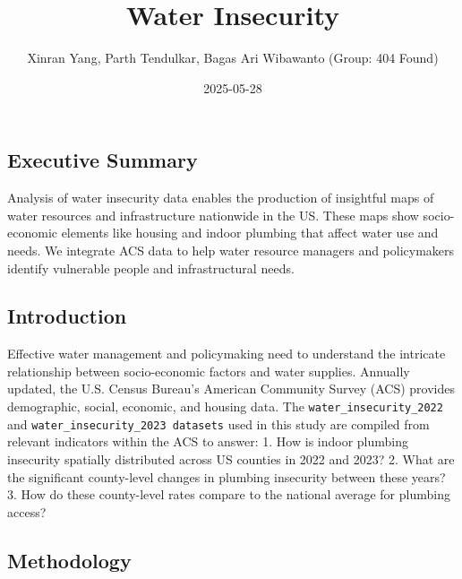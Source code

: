 \documentclass[
  letterpaper,
  DIV=11,
  numbers=noendperiod]{scrartcl}
\title{Water Insecurity}
\author{Xinran Yang, Parth Tendulkar, Bagas Ari Wibawanto (Group: 404
Found)}
\date{2025-05-28}
\renewcommand*\contentsname{Table of contents}
\newcommand\contentsname{Table of contents}
\begin{document}
\maketitle
\ifdefined\Shaded\renewenvironment{Shaded}{\begin{tcolorbox}[boxrule=0pt, breakable, borderline west={3pt}{0pt}{shadecolor}, interior hidden, sharp corners, enhanced, frame hidden]}{\end{tcolorbox}}\fi

\renewcommand*\contentsname{Table of contents}
{
\hypersetup{linkcolor=}
\setcounter{tocdepth}{2}
\tableofcontents
}
\hypertarget{executive-summary}{%
\subsection{Executive Summary}\label{executive-summary}}

Analysis of water insecurity data enables the production of insightful
maps of water resources and infrastructure nationwide in the US. These
maps show socio-economic elements like housing and indoor plumbing that
affect water use and needs. We integrate ACS data to help water resource
managers and policymakers identify vulnerable people and infrastructural
needs.

\hypertarget{introduction}{%
\subsection{Introduction}\label{introduction}}

Effective water management and policymaking need to understand the
intricate relationship between socio-economic factors and water
supplies. Annually updated, the U.S. Census Bureau's American Community
Survey (ACS) provides demographic, social, economic, and housing data.
The \texttt{water\_insecurity\_2022} and
\texttt{water\_insecurity\_2023\ datasets} used in this study are
compiled from relevant indicators within the ACS to answer: 1. How is
indoor plumbing insecurity spatially distributed across US counties in
2022 and 2023? 2. What are the significant county-level changes in
plumbing insecurity between these years? 3. How do these county-level
rates compare to the national average for plumbing access?

\hypertarget{methodology}{%
\subsection{Methodology}\label{methodology}}
\end{document}
